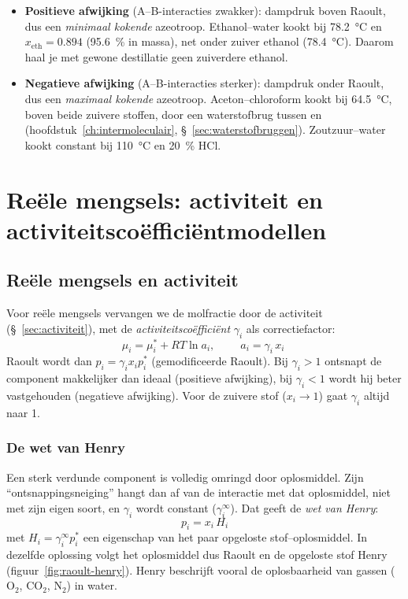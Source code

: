 \begin{itemize}
\item \textbf{Positieve afwijking} (A--B-interacties zwakker): dampdruk boven Raoult, dus een \emph{minimaal kokende} azeotroop. Ethanol--water kookt bij \SI{78.2}{\celsius} en $x_{\text{eth}} = 0.894$ (\SI{95.6}{\percent} in massa), net onder zuiver ethanol (\SI{78.4}{\celsius}). Daarom haal je met gewone destillatie geen zuiverdere ethanol.
\item \textbf{Negatieve afwijking} (A--B-interacties sterker): dampdruk onder Raoult, dus een \emph{maximaal kokende} azeotroop. Aceton--chloroform kookt bij \SI{64.5}{\celsius}, boven beide zuivere stoffen, door een waterstofbrug tussen  en  (hoofdstuk~\ref{ch:intermoleculair}, \S~\ref{sec:waterstofbruggen}). Zoutzuur--water kookt constant bij \SI{110}{\celsius} en \SI{20}{\percent} HCl.
\end{itemize}

\section{Re\"ele mengsels: activiteit en activiteitsco\"effici\"entmodellen}

\subsection{Re\"ele mengsels en activiteit}
\label{sec:activiteit-mengsel}

Voor re\"ele mengsels vervangen we de molfractie door de activiteit (\S~\ref{sec:activiteit}), met de \emph{activiteitsco\"effici\"ent} $\gamma_i$ als correctiefactor:
\begin{equation}
\mu_i = \mu_i^* + RT \ln a_i, \qquad
\boxed{\;a_i = \gamma_i\,x_i\;}
\label{eq:activiteit-mengsel}
\end{equation}
Raoult wordt dan $p_i = \gamma_i x_i p_i^*$ (gemodificeerde Raoult). Bij $\gamma_i > 1$ ontsnapt de component makkelijker dan ideaal (positieve afwijking), bij $\gamma_i < 1$ wordt hij beter vastgehouden (negatieve afwijking). Voor de zuivere stof ($x_i \to 1$) gaat $\gamma_i$ altijd naar 1.

\subsubsection{De wet van Henry}
\label{sec:henry}

Een sterk verdunde component is volledig omringd door oplosmiddel. Zijn ``ontsnappingsneiging'' hangt dan af van de interactie met dat oplosmiddel, niet met zijn eigen soort, en $\gamma_i$ wordt constant ($\gamma_i^\infty$). Dat geeft de \emph{wet van Henry}:
\begin{equation}
\boxed{\;p_i = x_i\,H_i\;}
\label{eq:henry}
\end{equation}
met $H_i = \gamma_i^\infty p_i^*$ een eigenschap van het paar opgeloste stof--oplosmiddel. In dezelfde oplossing volgt het oplosmiddel dus Raoult en de opgeloste stof Henry (figuur~\ref{fig:raoult-henry}). Henry beschrijft vooral de oplosbaarheid van gassen ($\mathrm{O_2}$, $\mathrm{CO_2}$, $\mathrm{N_2}$) in water.

